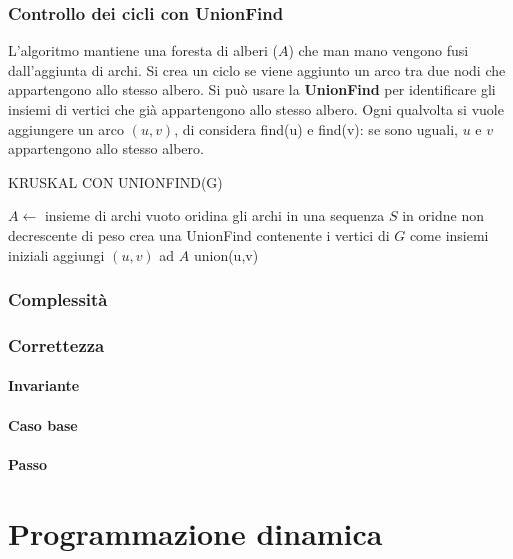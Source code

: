 \documentclass[11pt]{article}
\begin{document}
\subsubsection{Controllo dei cicli con UnionFind}
L'algoritmo mantiene una foresta di alberi ($A$) che man mano vengono fusi dall'aggiunta di archi. Si crea un ciclo se 
viene aggiunto un arco tra due nodi che appartengono allo stesso albero. Si può usare la \textbf{UnionFind} per identificare 
gli insiemi di vertici che già appartengono allo stesso albero. Ogni qualvolta si vuole aggiungere un arco $(u,v)$, di 
considera find(u) e find(v): se sono uguali, $u$ e $v$ appartengono allo stesso albero.
\begin{algorithm}
    \caption{KRUSKAL CON UNIONFIND(G)}
    \begin{algorithmic}
        \State $A\gets$ insieme di archi vuoto 
        \State oridina gli archi in una sequenza $S$ in oridne non decrescente di peso 
        \State crea una UnionFind contenente i vertici di $G$ come insiemi iniziali 
                \State aggiungi $(u,v)$ ad $A$
                \State union(u,v)
            \EndIf 
        \EndFor
    \end{algorithmic}
\end{algorithm}
\subsubsection{Complessità}

\subsubsection{Correttezza}
\paragraph*{Invariante}

\paragraph*{Caso base}

\paragraph*{Passo}

\section{Programmazione dinamica}
\end{document}
